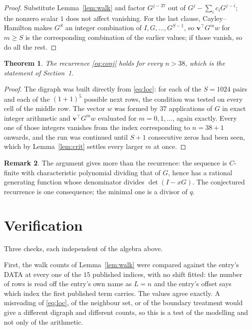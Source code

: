 \documentclass[11pt,a4paper]{article}
\theoremstyle{plain}
\newtheorem{theorem}{Theorem}
\theoremstyle{definition}
\newtheorem{remark}[theorem]{Remark}
\begin{document}
\begin{proof}
Substitute Lemma~\ref{lem:walk} and factor $G^{j-37}$ out of
$G^{j}-\sum_ic_iG^{j-i}$; the nonzero scalar $1$ does not affect
vanishing. For the last clause, Cayley--Hamilton makes $G^{S}$ an integer combination of
$I,G,\dots,G^{S-1}$, so $\mathbf{v}^{\!\top}G^{m}w$ for $m\ge S$ is the corresponding
combination of the earlier values; if those vanish, so do all the rest.
\end{proof}

\begin{theorem}
The recurrence \eqref{eq:conj} holds for every $n>38$, which is the statement of
Section~1.
\end{theorem}

\begin{proof}
The digraph was built directly from \eqref{eq:loc}: for each of the $S=1024$ pairs and each
of the $(1+1)^{5}$ possible next rows, the condition was tested on every cell of
the middle row. The vector $w$ was formed by $37$ applications of $G$ in exact integer
arithmetic and $\mathbf{v}^{\!\top}G^{m}w$ evaluated for $m=0,1,\dots$, again exactly.
Every one of those integers vanishes from the index corresponding to $n=38+1$ onwards,
and the run was continued until $S+1$ consecutive zeros had been seen, which by
Lemma~\ref{lem:crit} settles every larger $m$ at once.
\end{proof}

\begin{remark}
The argument gives more than the recurrence: the sequence is $C$-finite with characteristic
polynomial dividing that of $G$, hence has a rational generating function whose denominator
divides $\det(I-xG)$. The conjectured recurrence is one consequence; the minimal one is a
divisor of $q$.
\end{remark}

\section{Verification}

Three checks, each independent of the algebra above.

First, the walk counts of Lemma~\ref{lem:walk} were compared against the entry's DATA at
every one of the $15$ published indices, with no shift fitted: the number of rows is
read off the entry's own name as $L=n$ and the entry's offset says which index the first
published term carries. The values agree exactly. A misreading of \eqref{eq:loc}, of the
neighbour set, or of the boundary treatment would give a different digraph and different
counts, so this is a test of the modelling and not only of the arithmetic.
\end{document}
